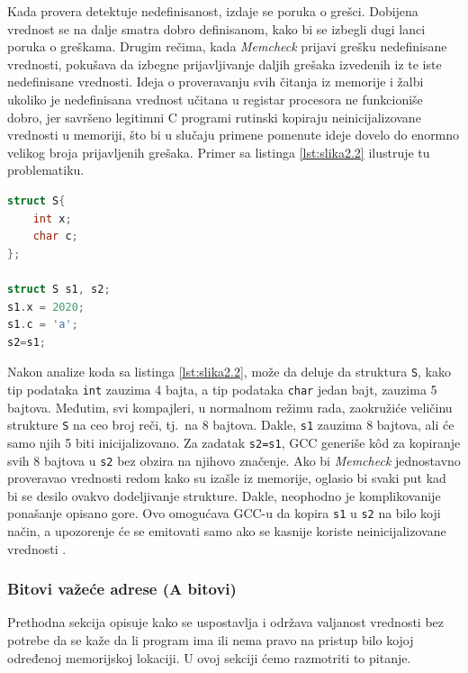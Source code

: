 \documentclass[12pt,oneside]{memoir}
\theoremstyle{plain}
\theoremstyle{definition}
\begin{document}
Kada provera detektuje nedefinisanost, izdaje se poruka o grešci. Dobijena vrednost se na dalje smatra dobro definisanom, kako bi se izbegli dugi lanci poruka o greškama. Drugim rečima, kada \textit{Memcheck} prijavi grešku nedefinisane vrednosti, pokušava da izbegne prijavljivanje daljih grešaka izvedenih iz te iste nedefinisane vrednosti. Ideja o proveravanju svih čitanja iz memorije i žalbi ukoliko je nedefinisana vrednost učitana u registar procesora ne funkcioniše dobro, jer savršeno legitimni C programi rutinski kopiraju neinicijalizovane vrednosti u memoriji, što bi u slučaju primene pomenute ideje dovelo do enormno velikog broja prijavljenih grešaka. Primer sa listinga \ref{lst:slika2.2} ilustruje tu problematiku.

\begin{lstlisting}[style=mystyle,caption={Primer kratkog segmenta koda}, label={lst:slika2.2},language={C}] 
struct S{
	int x;
	char c;
};

struct S s1, s2;
s1.x = 2020;
s1.c = 'a';
s2=s1;
\end{lstlisting}


Nakon analize koda sa listinga \ref{lst:slika2.2}, može da deluje da struktura \texttt{S}, kako tip podataka \texttt{int} zauzima 4 bajta, a tip podataka \texttt{char} jedan bajt, zauzima 5 bajtova. Međutim, svi kompajleri, u normalnom režimu rada, zaokružiće veličinu strukture \texttt{S} na ceo broj reči, tj.~na 8 bajtova. Dakle, \texttt{s1} zauzima 8 bajtova, ali će samo njih 5 biti inicijalizovano. Za zadatak \texttt{s2=s1}, GCC generiše k\^od za kopiranje svih 8 bajtova u \texttt{s2} bez obzira na njihovo značenje. Ako bi \textit{Memcheck} jednostavno proveravao vrednosti redom kako su izašle iz memorije, oglasio bi svaki put kad bi se desilo ovakvo dodeljivanje strukture. Dakle, neophodno je komplikovanije ponašanje opisano gore. Ovo omogućava GCC-u da kopira \texttt{s1} u \texttt{s2} na bilo koji način, a upozorenje će se emitovati samo ako se kasnije koriste neinicijalizovane vrednosti \cite{Memcheck}. 

\subsubsection{Bitovi važeće adrese (A bitovi)}
Prethodna sekcija opisuje kako se uspostavlja i održava valjanost vrednosti bez potrebe da se kaže da li program ima ili nema pravo na pristup bilo kojoj određenoj memorijskoj lokaciji. U ovoj sekciji ćemo razmotriti to pitanje.
\end{document}
